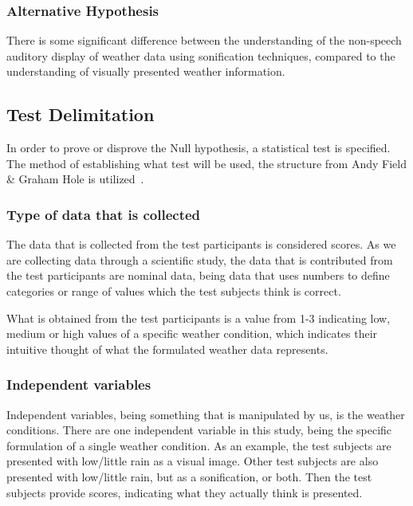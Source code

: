 \subsubsection*{Alternative Hypothesis} %
\label{ssub:alternative_hypothesis}

There is some significant difference between the understanding of the non-speech auditory display of weather data using sonification techniques, compared to the understanding of visually presented weather information.


\subsection{Test Delimitation} %
\label{sub:test_delimitation}

In order to prove or disprove the Null hypothesis, a statistical test is specified. 
The method of establishing what test will be used, the structure from Andy Field \& Graham Hole is utilized~\Cite[Ch. 8]{Field2003}.

\subsubsection{Type of data that is collected} %
\label{ssub:type_of_data_that_is_collected}

The data that is collected from the test participants is considered scores. 
As we are collecting data through a scientific study, the data that is contributed from the test participants are nominal data, being data that uses numbers to define categories or range of values which the test subjects think is correct.

What is obtained from the test participants is a value from 1-3 indicating low, medium or high values of a specific weather condition, which indicates their intuitive thought of what the formulated weather data represents.


\subsubsection{Independent variables} %
\label{ssub:independent_variables}

Independent variables, being something that is manipulated by us, is the weather conditions. 
There are one independent variable in this study, being the specific formulation of a single weather condition. 
As an example, the test subjects are presented with low/little rain as a visual image. 
Other test subjects are also presented with low/little rain, but as a sonification, or both. 
Then the test subjects provide scores, indicating what they actually think is presented.

